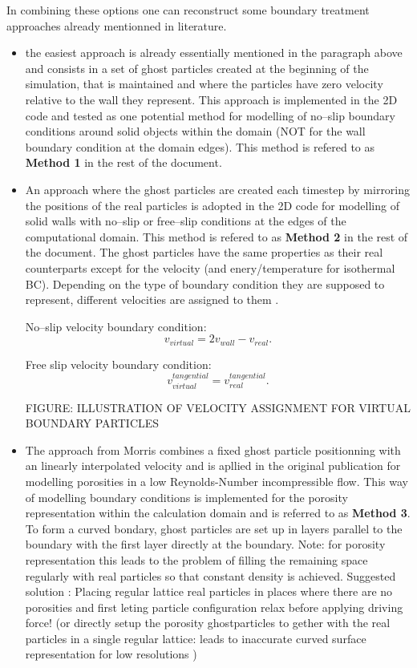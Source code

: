 \documentclass{report}
\begin{document}
In combining these options one can reconstruct some boundary treatment approaches already mentionned in literature.
\begin{itemize}
\item the easiest approach is already essentially mentioned in the paragraph above and consists in a set of ghost particles created at the beginning of the simulation, that is maintained and where the particles have zero velocity relative to the wall they represent. This approach is implemented in the 2D code and tested as one potential method for modelling of no--slip boundary conditions around solid objects within the domain (NOT for the wall boundary condition at the domain edges). This method is refered to as {\bf Method 1} in the rest of the document.

 \item An approach where the ghost particles are created each timestep by mirroring the positions of the real particles is adopted in the 2D code for modelling of solid walls with no--slip or free--slip conditions at the edges of the computational domain. This method is refered to as {\bf Method 2} in the rest of the document.
The ghost particles have the same properties as their real counterparts
except for the velocity (and enery/temperature for isothermal BC). Depending on the type of boundary condition they are
supposed to represent, different velocities are assigned to them \cite{Hu2006}.

No--slip velocity boundary condition:
\begin{equation}
v_{virtual}=2v_{wall}-v_{real}.
\end{equation}

Free slip velocity boundary condition:
\begin{equation}
v_{virtual}^{tangential}=v_{real}^{tangential}.
\end{equation}

FIGURE: ILLUSTRATION OF VELOCITY ASSIGNMENT FOR VIRTUAL BOUNDARY PARTICLES

\item The approach from Morris \cite{Morris1999} combines a fixed ghost particle positionning with an linearly interpolated velocity and is apllied in the original publication for modelling porosities in a low Reynolds-Number incompressible flow.
This way of modelling boundary conditions is implemented for the porosity representation within the calculation domain and is referred to as {\bf Method 3}.
To form a curved bondary, ghost particles are set up in layers parallel to the boundary with the first layer directly at the boundary. 
Note: for porosity representation this leads to the problem of filling the remaining space regularly with real particles so that constant density is achieved. Suggested solution \cite{Morris1997}: Placing regular lattice real particles in places where there are no porosities and first leting particle configuration relax before applying driving force! (or directly setup the porosity ghostparticles to gether with the real particles in a single regular lattice: leads to inaccurate curved surface representation for low resolutions \cite{Monaghan1997})


\end{itemize}
\end{document}
